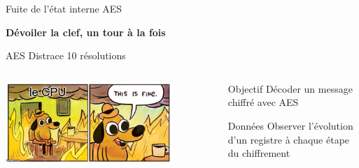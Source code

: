 \begin{frame}{Fuite de l'état interne AES}
    \large{\centerline{\textbf{Dévoiler la clef, un tour à la fois}}}
\end{frame}

\begin{frame}{AES Distrace \FiveStar\FiveStar \hfill 10 résolutions}
    \begin{columns}[c]
        \begin{center}                  
            \includegraphics[width=0.8\textwidth]{img/meme/distrace-intro.png}
        \end{center}

           \begin{outline}
               \1 Objectif
                \2 Décoder un message chiffré avec AES

            \pause
               \1 Données
                \2 Observer l'évolution d'un registre à chaque étape du chiffrement 
           \end{outline}
    \end{columns}
\end{frame}


